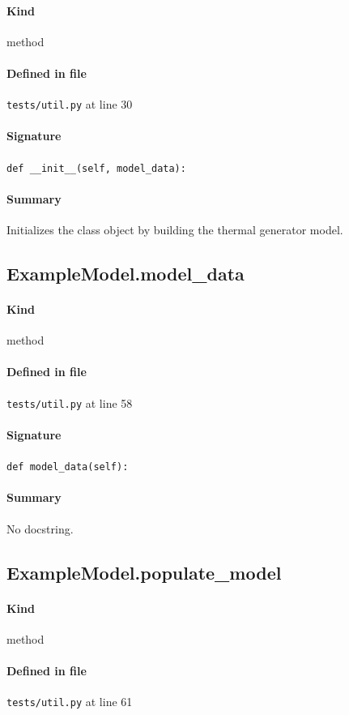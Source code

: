 \documentclass[11pt]{report}
\begin{document}
\paragraph{Kind} method
\paragraph{Defined in file} \texttt{tests/util.py} at line 30
\paragraph{Signature} \texttt{def \_\_init\_\_(self, model\_data):}
\paragraph{Summary} Initializes the class object by building the thermal generator model.
\subsection{ExampleModel.model\_data}
\label{def:tests-util.py:ExampleModel.model_data:L58}
\paragraph{Kind} method
\paragraph{Defined in file} \texttt{tests/util.py} at line 58
\paragraph{Signature} \texttt{def model\_data(self):}
\paragraph{Summary} No docstring.
\subsection{ExampleModel.populate\_model}
\label{def:tests-util.py:ExampleModel.populate_model:L61}
\paragraph{Kind} method
\paragraph{Defined in file} \texttt{tests/util.py} at line 61
\end{document}
